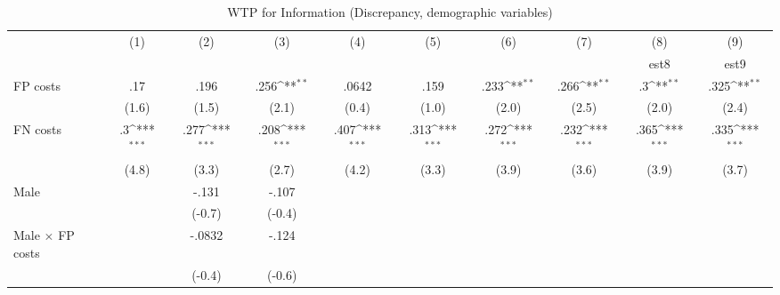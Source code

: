 \begin{table}[htbp]\centering
\def\sym#1{\ifmmode^{#1}\else\(^{#1}\)\fi}
\caption{WTP for Information (Discrepancy, demographic variables)}
\begin{tabular}{l*{9}{c}}
\hline\hline
                &\multicolumn{1}{c}{(1)}&\multicolumn{1}{c}{(2)}&\multicolumn{1}{c}{(3)}&\multicolumn{1}{c}{(4)}&\multicolumn{1}{c}{(5)}&\multicolumn{1}{c}{(6)}&\multicolumn{1}{c}{(7)}&\multicolumn{1}{c}{(8)}&\multicolumn{1}{c}{(9)}\\
                &\multicolumn{1}{c}{}&\multicolumn{1}{c}{}&\multicolumn{1}{c}{}&\multicolumn{1}{c}{}&\multicolumn{1}{c}{}&\multicolumn{1}{c}{}&\multicolumn{1}{c}{}&\multicolumn{1}{c}{est8}&\multicolumn{1}{c}{est9}\\
\hline
FP costs        &      .17         &     .196         &     .256\sym{**} &    .0642         &     .159         &     .233\sym{**} &     .266\sym{**} &       .3\sym{**} &     .325\sym{**} \\
                &    (1.6)         &    (1.5)         &    (2.1)         &    (0.4)         &    (1.0)         &    (2.0)         &    (2.5)         &    (2.0)         &    (2.4)         \\
FN costs        &       .3\sym{***}&     .277\sym{***}&     .208\sym{***}&     .407\sym{***}&     .313\sym{***}&     .272\sym{***}&     .232\sym{***}&     .365\sym{***}&     .335\sym{***}\\
                &    (4.8)         &    (3.3)         &    (2.7)         &    (4.2)         &    (3.3)         &    (3.9)         &    (3.6)         &    (3.9)         &    (3.7)         \\
Male            &                  &    -.131         &    -.107         &                  &                  &                  &                  &                  &                  \\
                &                  &   (-0.7)         &   (-0.4)         &                  &                  &                  &                  &                  &                  \\
Male $\times$ FP costs&                  &   -.0832         &    -.124         &                  &                  &                  &                  &                  &                  \\
                &                  &   (-0.4)         &   (-0.6)         &                  &                  &                  &                  &                  &                  \\

\end{tabular}
\end{table}
